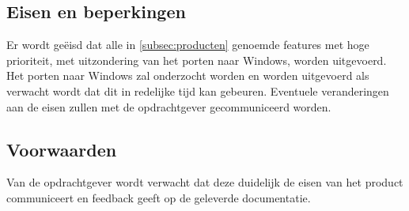\subsection{Eisen en beperkingen}
Er wordt ge\"eisd dat alle in \ref{subsec:producten} genoemde features met hoge prioriteit, met uitzondering van het porten naar Windows, worden uitgevoerd. Het porten naar Windows zal onderzocht worden en worden uitgevoerd als verwacht wordt dat dit in redelijke tijd kan gebeuren. Eventuele veranderingen aan de eisen zullen met de opdrachtgever gecommuniceerd worden.

\subsection{Voorwaarden}
Van de opdrachtgever wordt verwacht dat deze duidelijk de eisen van het product communiceert en feedback geeft op de geleverde documentatie.  
